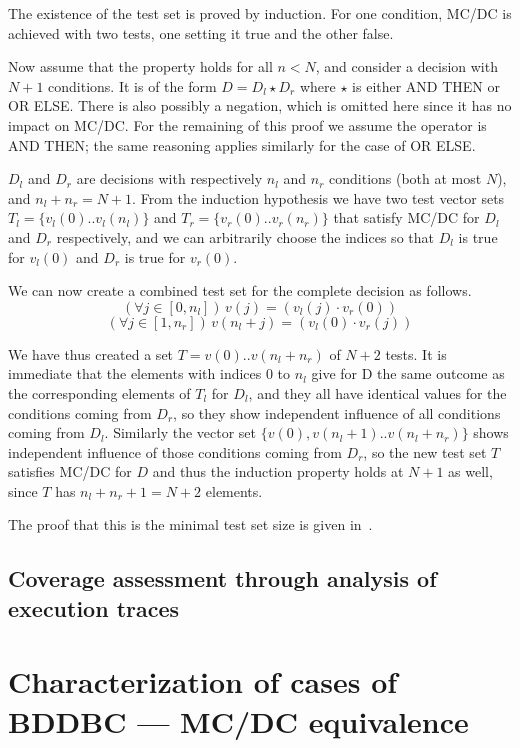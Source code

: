 \documentclass[a4paper,12pt,twoside]{article}
\begin{document}
The existence of the test set is proved by induction. For one condition,
MC/DC is achieved with two tests, one setting it true and the other false.

Now assume that the property holds for all $n<N$, and consider a decision
with $N+1$ conditions. It is of the form $D = D_l \star D_r$ where
$\star$ is either AND THEN or OR ELSE. There is also possibly a negation,
which is omitted here since it has no impact on MC/DC. For the remaining
of this proof we assume the operator is AND THEN; the same reasoning applies
similarly for the case of OR ELSE.

$D_l$ and $D_r$ are decisions with respectively $n_l$ and $n_r$ conditions
(both at most $N$), and $n_l + n_r = N+1$. From the induction hypothesis
we have two test vector sets $T_l = \{ v_l (0) .. v_l (n_l) \}$ and
$T_r = \{ v_r (0) .. v_r (n_r) \}$ that satisfy MC/DC for $D_l$ and $D_r$
respectively, and we can arbitrarily choose the indices so that
$D_l$ is true for $v_l(0)$ and $D_r$ is true for $v_r (0)$.

We can now create a combined test set for the complete decision as follows.
$$(\forall j \in [0, n_l])\, v (j) = (v_l (j) \cdot v_r (0))$$
$$(\forall j \in [1, n_r])\, v (n_l + j) = (v_l (0) \cdot v_r (j))$$

We have thus created a set $T = { v(0) .. v(n_l + n_r) }$ of $N+2$ tests.
It is immediate that the elements with indices 0 to $n_l$ give for D
the same outcome as the corresponding elements of $T_l$ for $D_l$,
and they all have identical values for the conditions coming from $D_r$,
so they show independent influence of all conditions coming from $D_l$.
Similarly the vector set $\{v(0), v(n_l+1) .. v(n_l + n_r)\}$ shows
independent influence of those conditions coming from $D_r$, so the new
test set $T$ satisfies MC/DC for $D$ and thus the induction property holds at
$N+1$ as well, since $T$ has $n_l + n_r + 1 = N+2$ elements.

The proof that this is the minimal test set size is given in~\cite{ar0118}.

\subsection{Coverage assessment through analysis of execution traces}


\section{Characterization of cases of BDDBC --- MC/DC equivalence}
\end{document}
